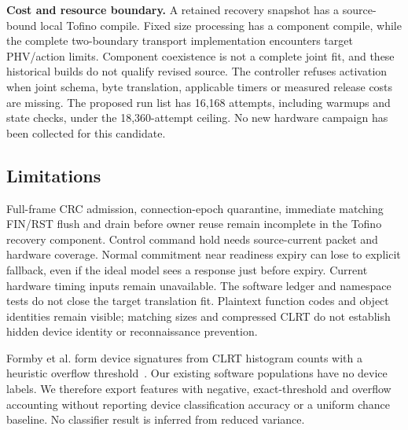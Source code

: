 \textbf{Cost and resource boundary.} A retained recovery snapshot has a source-bound
local Tofino compile. Fixed size processing has a component compile, while the complete
two-boundary transport implementation encounters target PHV/action limits.
Component coexistence is not a complete joint fit, and these historical builds
do not qualify revised source. The controller refuses
activation when joint schema, byte translation, applicable timers or measured
release costs are missing. The proposed run list has 16,168 attempts, including
warmups and state checks, under the 18,360-attempt ceiling. No new hardware
campaign has been collected for this candidate.

\subsection{Limitations}
Full-frame CRC admission, connection-epoch quarantine, immediate matching
FIN/RST flush and drain before owner reuse remain incomplete in the Tofino
recovery component. Control command hold needs source-current packet and
hardware coverage. Normal commitment near readiness expiry can lose to explicit
fallback, even if the ideal model sees a response just before expiry. Current
hardware timing inputs remain unavailable. The software ledger and namespace
tests do not close the target translation fit. Plaintext function codes and
object identities remain visible; matching sizes and compressed CLRT do not
establish hidden device identity or reconnaissance prevention.

Formby et al. form device signatures from CLRT histogram counts with a heuristic
overflow threshold~\cite{formby2016}. Our existing software populations have no
device labels. We therefore export features with negative, exact-threshold and
overflow accounting without reporting device classification accuracy or a
uniform chance baseline. No classifier result is inferred from reduced variance.
